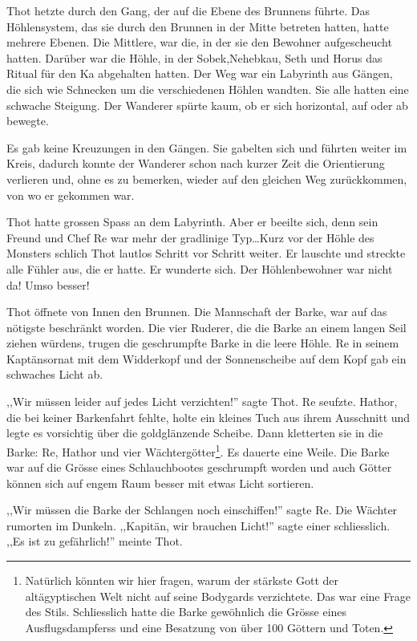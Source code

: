 \documentclass[11pt,titlepage,a5paper]{book}
\begin{document}
Thot hetzte durch den Gang, der auf die Ebene des Brunnens führte. Das Höhlensystem, das sie durch den Brunnen in der Mitte betreten hatten, hatte mehrere Ebenen. Die Mittlere, war die, in der sie den Bewohner aufgescheucht hatten. Darüber war die Höhle, in der Sobek,Nehebkau, Seth und Horus das Ritual für den Ka abgehalten hatten. Der Weg war ein Labyrinth aus Gängen, die sich wie Schnecken um die verschiedenen Höhlen wandten. Sie alle hatten eine schwache Steigung. Der Wanderer spürte kaum, ob er sich horizontal, auf oder ab bewegte.

Es gab keine Kreuzungen in den Gängen. Sie gabelten sich und führten weiter im Kreis, dadurch konnte der Wanderer schon nach kurzer Zeit die Orientierung verlieren und, ohne es zu bemerken, wieder auf den gleichen Weg zurückkommen, von wo er gekommen war.

Thot hatte grossen Spass an dem Labyrinth. Aber er beeilte sich, denn sein Freund und Chef Re war mehr der gradlinige Typ\dots Kurz vor der Höhle des Monsters schlich Thot lautlos Schritt vor Schritt weiter. Er lauschte und streckte alle Fühler aus, die er hatte. Er wunderte sich. Der Höhlenbewohner war nicht da! Umso besser!

Thot öffnete von Innen den Brunnen. Die Mannschaft der Barke, war auf das nötigste beschränkt worden. Die vier Ruderer, die die Barke an einem langen Seil ziehen würdens, trugen die geschrumpfte Barke in die leere Höhle. Re in seinem Kaptänsornat mit dem Widderkopf und der Sonnenscheibe auf dem Kopf gab ein schwaches Licht ab. 

,,Wir müssen leider auf jedes Licht verzichten!'' sagte Thot. Re seufzte. Hathor, die bei keiner Barkenfahrt fehlte, holte ein kleines Tuch aus ihrem Ausschnitt und legte es vorsichtig über die goldglänzende Scheibe. Dann kletterten sie in die Barke: Re, Hathor und vier Wächtergötter\footnote{Natürlich könnten wir hier fragen, warum der stärkste Gott der altägyptischen Welt nicht auf seine Bodygards verzichtete. Das war eine Frage des Stils. Schliesslich hatte die Barke gewöhnlich die Grösse eines Ausflugsdampferss und eine Besatzung von über 100 Göttern und Toten.}. Es dauerte eine Weile. Die Barke war auf die Grösse eines Schlauchbootes geschrumpft worden und auch Götter können sich auf engem Raum besser mit etwas Licht sortieren. 

,,Wir müssen die Barke der Schlangen noch einschiffen!'' sagte Re. Die Wächter rumorten im Dunkeln. ,,Kapitän, wir brauchen Licht!''  sagte einer schliesslich. ,,Es ist zu gefährlich!'' meinte Thot.
\end{document}
